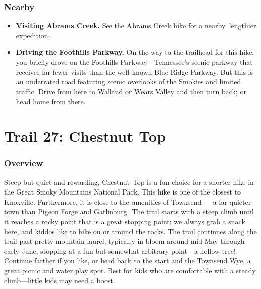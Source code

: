 \documentclass[
  letterpaper,
  DIV=11,
  numbers=noendperiod]{scrreprt}
\providecommand{\tightlist}{%
  \setlength{\itemsep}{0pt}\setlength{\parskip}{0pt}}\usepackage{longtable,booktabs,array}
\begin{document}
\subsection{Nearby}\label{nearby-25}

\begin{itemize}
\tightlist
\item
  \textbf{Visiting Abrams Creek.} See the Abrams Creek hike for a
  nearby, lengthier expedition.
\item
  \textbf{Driving the Foothills Parkway.} On the way to the trailhead
  for this hike, you briefly drove on the Foothills
  Parkway---Tennessee's scenic parkway that receives far fewer visits
  than the well-known Blue Ridge Parkway. But this is an underrated road
  featuring scenic overlooks of the Smokies and limited traffic. Drive
  from here to Walland or Wears Valley and then turn back; or head home
  from there.
\end{itemize}

\chapter{Trail 27: Chestnut Top}\label{trail-27-chestnut-top}

\subsection{Overview}\label{overview-27}

Steep but quiet and rewarding, Chestnut Top is a fun choice for a
shorter hike in the Great Smoky Mountains National Park. This hike is
one of the closest to Knoxville. Furthermore, it is close to the
amenities of Townsend --- a far quieter town than Pigeon Forge and
Gatlinburg. The trail starts with a steep climb until it reaches a rocky
point that is a great stopping point; we always grab a snack here, and
kiddos like to hike on or around the rocks. The trail continues along
the trail past pretty mountain laurel, typically in bloom around mid-May
through early June, stopping at a fun but somewhat arbitrary point - a
hollow tree! Continue farther if you like, or head back to the start and
the Townsend Wye, a great picnic and water play spot. Best for kids who
are comfortable with a steady climb---little kids may need a boost.
\end{document}
